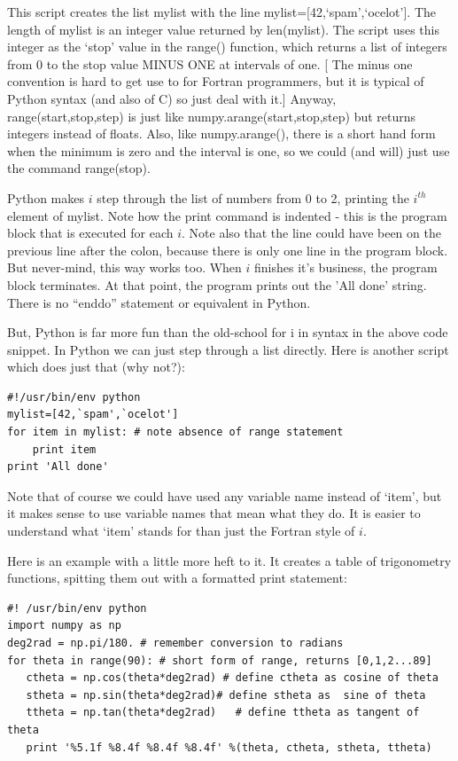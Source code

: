 \documentclass[11pt]{book}
\begin{document}
{{{This script creates the list mylist with the line {\color{blue}mylist=[42,`spam',`ocelot']}.  The length of mylist is an integer value returned by {\color{blue}len(mylist)}.      The script uses this integer as the `stop' value in the  {\color{blue}range()} function,  which returns a list of integers from 0 to the stop value  MINUS ONE at intervals of one.   [ The minus one convention is hard to get use to  for Fortran programmers, but it is typical of Python syntax (and also of C) so just deal with it.]  Anyway, {\color{blue}range(start,stop,step)} is just like {\color{blue}numpy.arange(start,stop,step)} but returns integers instead of floats.  Also, like {\color{blue}numpy.arange()}, there is a short hand form when the minimum is zero and the interval is one, so we could (and will)  just use the command {\color{blue}range(stop)}. 
  
   Python makes $i$ step through the list of numbers from 0 to 2, printing the $i^{th}$ element of {\color{blue}mylist}.  Note how the print command is indented - this is the program block that is executed for each $i$.   Note also that the line could have been on the previous line after the colon, because there is only one line in the program block.  But never-mind, this way works too.   When $i$ finishes it's business, the program block terminates.   At that point, the program prints out the 'All done' string.   There is no ``enddo'' statement or equivalent in Python.  

But, Python is far more fun than the old-school {\color{blue}for i in} syntax in the above code snippet.  In Python we can just step through a list directly.  Here is another  script which does just that (why not?):  

{ \color{blue} \begin{verbatim}
#!/usr/bin/env python
mylist=[42,`spam',`ocelot']
for item in mylist: # note absence of range statement
    print item
print 'All done' 
\end{verbatim}}

\noindent Note that of course we could have used any variable name instead of `item', but it makes sense to use variable names that mean what they do.  It is easier to understand what `item' stands for than just the Fortran style of $i$.  

Here is an example with a little more heft to it.  It creates a table of trigonometry functions, spitting them out with a formatted print statement:

{ \color{blue} \begin{verbatim}
#! /usr/bin/env python
import numpy as np
deg2rad = np.pi/180. # remember conversion to radians
for theta in range(90): # short form of range, returns [0,1,2...89]
   ctheta = np.cos(theta*deg2rad) # define ctheta as cosine of theta
   stheta = np.sin(theta*deg2rad)# define stheta as  sine of theta
   ttheta = np.tan(theta*deg2rad)   # define ttheta as tangent of theta
   print '%5.1f %8.4f %8.4f %8.4f' %(theta, ctheta, stheta, ttheta) 
 \end{verbatim}}
 
}}}
\end{document}
